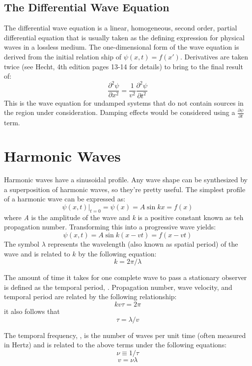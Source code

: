 \documentclass[12pt]{report}
\begin{document}
\subsection{The Differential Wave Equation}
The differential wave equation is a linear, homogeneous, second order, partial differential equation that is usually taken as the defining expression for physical waves in a lossless medium. The one-dimensional form of the wave equation is derived from the initial relation ship of $\psi(x,t) = f(x')$. Derivatives are taken twice (see Hecht, 4th edition pages 13-14 for details) to bring to the final result of:
\begin{equation}
\frac{\partial ^2\psi}{\partial x^2} = \frac{1}{v^2}\frac{\partial ^2\psi}{\partial t^2}
\end{equation}
This is the wave equation for undamped systems that do not contain sources in the region under consideration. Damping effects would be considered using a $\frac{\partial \psi}{\partial t} $ term.

\section{Harmonic Waves}
Harmonic waves have a sinusoidal profile. Any wave shape can be synthesized by a superposition of harmonic waves, so they're pretty useful. The simplest profile of a harmonic wave can be expressed as: \[\psi(x,t)|_{t=0}=\psi(x) = A\sin kx = f(x)\] where \emph{A} is the amplitude of the wave and \emph{k} is a positive constant known as teh propagation number. Transforming this into a progressive wave yields: 
\begin{equation}
\psi(x,t) = A\sin k(x-vt) = f(x-vt)
\end{equation} 
The symbol $\lambda$ represents the wavelength (also known as spatial period) of the wave and is related to $k$ by the following equation: 
\begin{equation}
k = 2\pi /\lambda
\end{equation}

The amount of time it takes for one complete wave to pass a stationary observer is defined as the temporal period, \texttau . Propagation number, wave velocity, and temporal period are related by the following relationship: \[kv\tau=2\pi\] it also follows that \[\tau=\lambda/v\]

The temporal frequency, \textnu , is the number of waves per unit time (often measured in Hertz) and is related to the above terms under the following equations:
\begin{equation}
\nu \equiv 1/\tau
\end{equation}
\begin{equation}
v = \nu\lambda
\end{equation}
\end{document}
